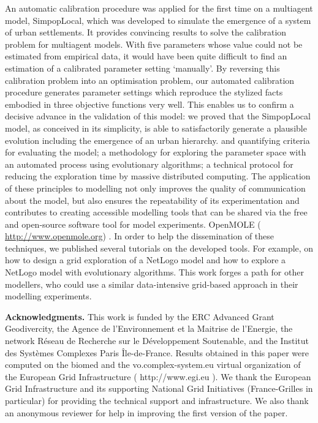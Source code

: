 An automatic calibration procedure was applied for the first time on a multiagent model, SimpopLocal, which was developed to simulate the emergence of a system of urban settlements. It provides convincing results to solve the calibration problem for multiagent models. With five parameters whose value could not be estimated from empirical data, it would have been quite difficult to find an estimation of a calibrated parameter setting ‘manually’. By reversing this calibration problem into an optimisation problem, our automated calibration procedure generates parameter settings which reproduce the stylized facts embodied in three objective functions very well. This enables us to confirm a decisive advance in the validation of this model: we proved that the SimpopLocal model, as conceived in its simplicity, is able to satisfactorily generate a plausible evolution including the emergence of an urban hierarchy. and quantifying criteria for evaluating the model; a methodology for exploring the parameter space with an automated process using evolutionary algorithms; a technical protocol for reducing the exploration time by massive distributed computing. The application of these principles to modelling not only improves the quality of communication about the model, but also ensures the repeatability of its experimentation and contributes to creating accessible modelling tools that can be shared via the free and open-source software tool for model experiments. OpenMOLE ( \href{http://www.openmole.org}{http://www.openmole.org}) . In order to help the dissemination of these techniques, we published several tutorials on the developed tools. For example, on how to design a grid exploration of a NetLogo model and how to explore a NetLogo model with evolutionary algorithms. This work forges a path for other modellers, who could use a similar data-intensive grid-based approach in their modelling experiments.

\textbf{Acknowledgments.} This work is funded by the ERC Advanced Grant Geodivercity, the Agence de l’Environnement et la Maitrise de l’Energie, the network Réseau de Recherche sur le Développement Soutenable, and the Institut des Systèmes Complexes Paris Île-de-France. Results obtained in this paper were computed on the biomed and the vo.complex-system.eu virtual organization of the European Grid Infrastructure ( http://www.egi.eu ). We thank the European Grid Infrastructure and its supporting National Grid Initiatives (France-Grilles in particular) for providing the technical support and infrastructure. We also thank an anonymous reviewer for help in improving the first version of the paper.

